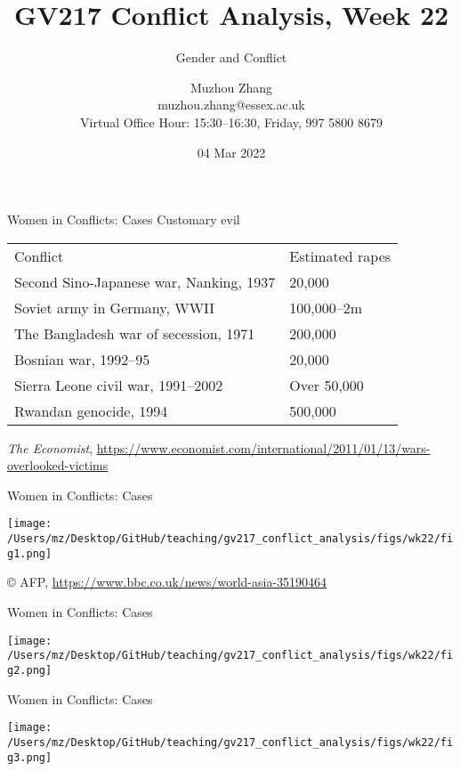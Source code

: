 \documentclass{beamer}
\title{GV217 Conflict Analysis, Week 22}
\subtitle{Gender and Conflict}
\author{Muzhou Zhang\\ muzhou.zhang@essex.ac.uk\\ Virtual Office Hour: 15:30--16:30, Friday, 997 5800 8679}
\date{04 Mar 2022}
\begin{document}
\maketitle
{}

\begin{frame}{Women in Conflicts: Cases}
    \pause
    Customary evil
    \begin{tabular}{ll}
        Conflict                                                    & Estimated rapes \\
        Second Sino-Japanese war, Nanking, 1937                     & 20,000          \\
        Soviet army in Germany, WWII                                & 100,000--2m     \\
        The Bangladesh war of secession, 1971                       & 200,000         \\
        Bosnian war, 1992--95                                       & 20,000          \\
        Sierra Leone civil war, 1991--2002                          & Over 50,000     \\
        Rwandan genocide, 1994                                      & 500,000        
    \end{tabular}
    \tiny \emph{The Economist}, \url{https://www.economist.com/international/2011/01/13/wars-overlooked-victims}
\end{frame}

\begin{frame}{Women in Conflicts: Cases}
    \pause
    \begin{center}
        \texttt{[image: /Users/mz/Desktop/GitHub/teaching/gv217\_conflict\_analysis/figs/wk22/fig1.png]}
    \end{center}
    \tiny © AFP, \url{https://www.bbc.co.uk/news/world-asia-35190464}
\end{frame}

\begin{frame}{Women in Conflicts: Cases}
    \pause
    \begin{center}
        \texttt{[image: /Users/mz/Desktop/GitHub/teaching/gv217\_conflict\_analysis/figs/wk22/fig2.png]}
    \end{center}
\end{frame}

\begin{frame}{Women in Conflicts: Cases}
    \pause
    \begin{center}
        \texttt{[image: /Users/mz/Desktop/GitHub/teaching/gv217\_conflict\_analysis/figs/wk22/fig3.png]}
    \end{center}
\end{frame}
\end{document}
